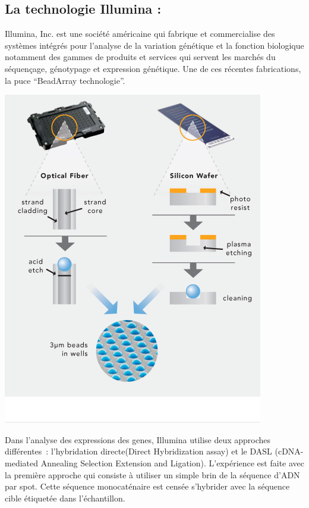\documentclass[a4paper,10pt]{article}
\begin{document}
\subsection{La technologie Illumina :}
Illumina, Inc. est une société américaine qui fabrique et commercialise des systèmes intégrés pour l'analyse de la variation génétique et la fonction biologique 
notamment des gammes de produits et services qui servent les marchés du séquençage, génotypage et expression génétique.
\newline
Une de ces récentes fabrications, la puce ``BeadArray technologie''.
\begin{center}
 \includegraphics[scale=0.5]{./image/beadarray.png}
\end{center}
Dans l’analyse des expressions des genes, Illumina utilise deux approches différentes : l’hybridation directe(Direct Hybridization assay) et le DASL (cDNA-mediated Annealing Selection Extension and Ligation).
L’expérience est faite avec la première approche qui consiste à utiliser un simple brin de la séquence d’ADN par spot. Cette séquence monocaténaire est censée s’hybrider avec la séquence cible étiquetée dans l’échantillon. 
\end{document}
